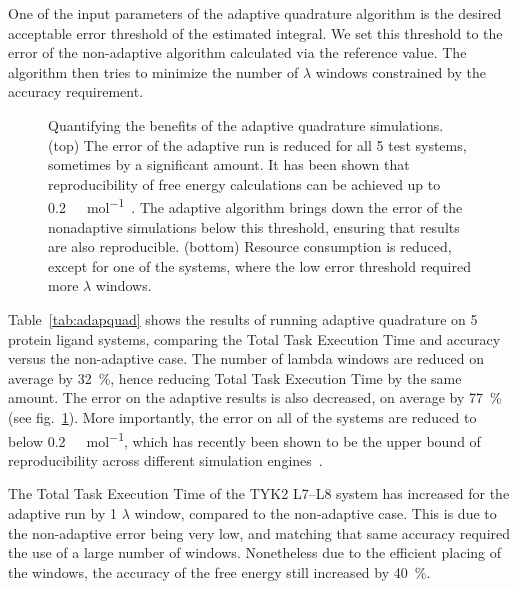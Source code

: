 One of the input parameters of the adaptive quadrature algorithm is the
desired acceptable error threshold of the estimated integral. We set this
threshold to the error of the non-adaptive algorithm calculated via the
reference value. The algorithm then tries to minimize the number of $\lambda$
windows constrained by the accuracy requirement.

\begin{figure}
  \caption{Quantifying the benefits of the adaptive quadrature simulations.
  (top) The error of the adaptive run is reduced for all 5 test systems,
  sometimes by a significant amount. It has been shown that reproducibility
  of free energy calculations can be achieved up to
  \SI{0.2}{\kilo\calorie\per\mole}~\cite{Loeffler2018}. The adaptive
  algorithm brings down the error of the nonadaptive simulations below this
  threshold, ensuring that results are also reproducible. (bottom) Resource
  consumption is reduced, except for one of the systems, where the low error
  threshold required more $\lambda$ windows.}\label{fig:savings}
\up{}
\up{}
\end{figure}

Table~\ref{tab:adapquad} shows the results of running adaptive quadrature on
5 protein ligand systems, comparing the Total Task Execution Time and
accuracy versus the non-adaptive case. The number of lambda windows are
reduced on average by \SI{32}{\percent}, hence reducing Total Task Execution
Time by the same amount. The error on the adaptive results is also decreased,
on average by \SI{77}{\percent} (see fig.~\ref{fig:savings}). More
importantly, the error on all of the systems are reduced to below
\SI{0.2}{\kilo\calorie\per\mole}, which has recently been shown to be the
upper bound of reproducibility across different simulation
engines~\cite{Loeffler2018}.

The Total Task Execution Time of the TYK2 L7--L8 system has increased for the
adaptive run by 1 $\lambda$ window, compared to the non-adaptive case. This
is due to the non-adaptive error being very low, and matching that same
accuracy required the use of a large number of windows. Nonetheless due to
the efficient placing of the windows, the accuracy of the free energy still
increased by \SI{40}{\percent}.

